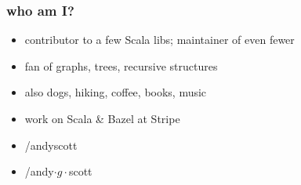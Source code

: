\documentclass[include/preamble.tex]{subfiles}
\begin{document}

\begin{frame}
  \frametitle{who am I?}
  \begin{itemize}
    \pause
  \item contributor to a few Scala libs; maintainer of even fewer
  \item fan of graphs, trees, recursive structures
  \item also dogs, hiking, coffee, books, music
  \item work on Scala \& Bazel at Stripe
    \newline
    \pause
  \item {} /andyscott
  \item {} /andy$\cdot{g}\cdot$scott
  \end{itemize}
\end{frame}
\end{document}
